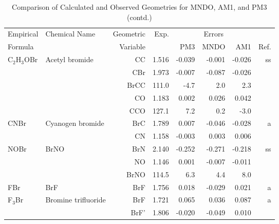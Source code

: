 \begin{table}
\caption{\label{geotabl}Comparison of Calculated and Observed Geometries for 
MNDO, AM1, and PM3 (contd.)}
\begin{center}
\compresstable
\begin{tabular}{llrrrrrr}
 Empirical  & Chemical Name &  Geometric &  Exp. & \multicolumn{3}{c}{Errors} & \\
  Formula   &               &  Variable &        & PM3  & MNDO  &  AM1 & Ref.\\
\hline
 C$_2$H$_3$OBr     & Acetyl bromide                     &CC            &     1.516   &    -0.039 &    -0.001 &    -0.026 &    ss \\
             &                                    &CBr           &     1.973   &    -0.007 &    -0.087 &    -0.026 &       \\
             &                                    &BrCC        &     111.0   &      -4.7 &       2.0 &       2.3   &       \\
             &                                    &CO            &     1.183   &     0.002 &     0.026 &     0.042 &       \\
             &                                    &CCO         &     127.1   &       7.2 &       0.2 &      -3.0   &       \\
 CNBr        & Cyanogen bromide                   &BrC           &     1.789   &     0.007 &    -0.046 &    -0.028 &     a \\
             &                                    &CN            &     1.158   &    -0.003 &     0.003 &     0.006 &       \\
 NOBr        & BrNO                               &BrN           &     2.140   &    -0.252 &    -0.271 &    -0.218 &    ss \\
             &                                    &NO            &     1.146   &     0.001 &    -0.007 &    -0.011 &       \\
             &                                    &BrNO        &     114.5   &       6.3 &       4.4 &       8.0   &       \\
 FBr         & BrF                                &BrF           &     1.756   &     0.018 &    -0.029 &     0.021 &     a \\
 F$_3$Br        & Bromine trifluoride                &BrF           &     1.721   &     0.065 &     0.036 &     0.087 &     a \\
             &                                    &BrF'          &     1.806   &    -0.020 &    -0.049 &     0.010 &       \\

\end{tabular}
\end{center}
\end{table}

